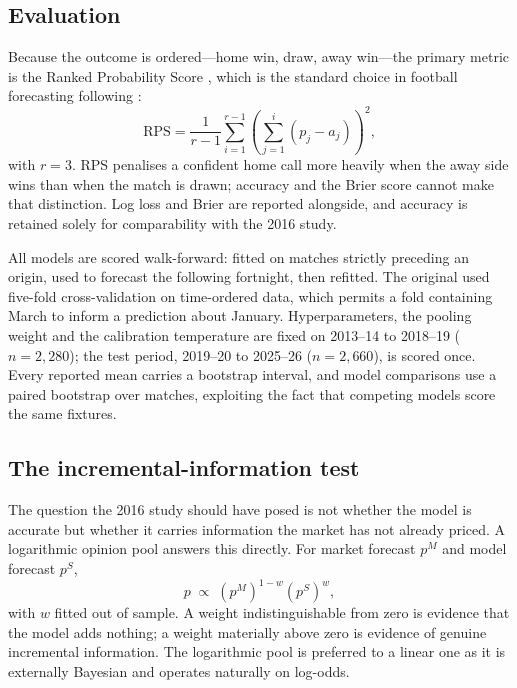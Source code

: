 \documentclass[11pt]{article}
\begin{document}
\subsection{Evaluation}

Because the outcome is ordered---home win, draw, away win---the primary metric
is the Ranked Probability Score \citep{epstein1969}, which is the standard
choice in football forecasting following \citet{constantinou2012}:
\begin{equation}
\mathrm{RPS} = \frac{1}{r-1} \sum_{i=1}^{r-1}
\left( \sum_{j=1}^{i} (p_j - a_j) \right)^{\!2} ,
\end{equation}
with $r=3$. RPS penalises a confident home call more heavily when the away side
wins than when the match is drawn; accuracy and the Brier score cannot make that
distinction. Log loss and Brier are reported alongside, and accuracy is retained
solely for comparability with the 2016 study.

All models are scored walk-forward: fitted on matches strictly preceding an
origin, used to forecast the following fortnight, then refitted. The original
used five-fold cross-validation on time-ordered data, which permits a fold
containing March to inform a prediction about January. Hyperparameters, the
pooling weight and the calibration temperature are fixed on
2013--14 to 2018--19 ($n = 2{,}280$); the test period, 2019--20 to 2025--26
($n = 2{,}660$), is scored once. Every reported mean carries a bootstrap
interval, and model comparisons use a paired bootstrap over matches, exploiting
the fact that competing models score the same fixtures.

\subsection{The incremental-information test}

The question the 2016 study should have posed is not whether the model is
accurate but whether it carries information the market has not already priced. A
logarithmic opinion pool answers this directly. For market forecast $p^{M}$ and
model forecast $p^{S}$,
\begin{equation}
p \;\propto\; \left(p^{M}\right)^{1-w} \left(p^{S}\right)^{w},
\end{equation}
with $w$ fitted out of sample. A weight indistinguishable from zero is evidence
that the model adds nothing; a weight materially above zero is evidence of
genuine incremental information. The logarithmic pool is preferred to a linear
one as it is externally Bayesian and operates naturally on log-odds.
\end{document}
